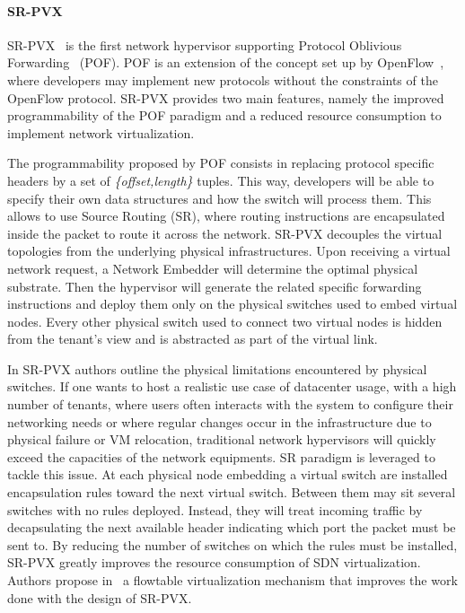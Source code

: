 \paragraph{SR-PVX}
SR-PVX~\cite{PVX-Li2017} is the first network hypervisor supporting Protocol Oblivious Forwarding~\cite{pof-song2013} (POF). POF is an extension of the concept set up by OpenFlow~\cite{Openflow-McKeown2008}, where developers may implement new protocols without the constraints of the OpenFlow protocol.
SR-PVX provides two main features, namely the improved programmability of the POF paradigm and a reduced resource consumption to implement network virtualization.

The programmability proposed by POF consists in replacing protocol specific headers by a set of \textit{\{offset,length\}} tuples. This way, developers will be able to specify their own data structures and how the switch will process them. This allows to use Source Routing (SR), where routing instructions are encapsulated inside the packet to route it across the network.
SR-PVX decouples the virtual topologies from the underlying physical infrastructures.
Upon receiving a virtual network request, a Network Embedder will determine the optimal physical substrate. Then the hypervisor will generate the related specific forwarding instructions and deploy them only on the physical switches used to embed virtual nodes. Every other physical switch used to connect two virtual nodes is hidden from the tenant's view and is abstracted as part of the virtual link.

In SR-PVX authors outline the physical limitations encountered by physical switches. If one wants to host a realistic use case of datacenter usage, with a high number of tenants, where users often interacts with the system to configure their networking needs or where regular changes occur in the infrastructure due to physical failure or VM relocation, traditional network hypervisors will quickly exceed the capacities of the network equipments. SR paradigm is leveraged to tackle this issue. At each physical node embedding a virtual switch are installed encapsulation rules toward the next virtual switch. Between them may sit several switches with no rules deployed. Instead, they will treat incoming traffic by decapsulating the next available header indicating which port the packet must be sent to. By reducing the number of switches on which the rules must be installed, SR-PVX greatly improves the resource consumption of SDN virtualization. Authors propose in~\cite{pvflow-Li2018} a flowtable virtualization mechanism that improves the work done with the design of SR-PVX.


